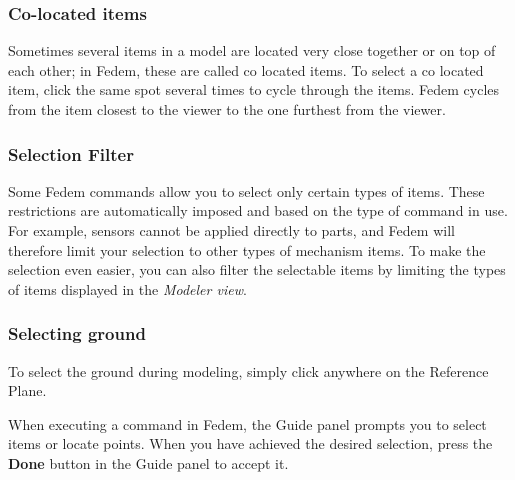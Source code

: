 
\subsubsection{Co-located items}

Sometimes several items in a model are located very close together or
on top of each other; in Fedem, these are called co located items.
To select a co located item, click the same spot several times to
cycle through the items. Fedem cycles from the item closest to the viewer to
the one furthest from the viewer.

\subsubsection{Selection Filter}

Some Fedem commands allow you to select only certain types of items.
These restrictions are automatically imposed and based on the type
of command in use. For example, sensors cannot be applied directly to
parts, and Fedem will therefore limit your selection to other types
of mechanism items. To make the selection even easier, you can also
filter the selectable items by limiting the types of items displayed
in the {\sl Modeler view}.


\subsubsection{Selecting ground}

To select the ground during modeling,
simply click anywhere on the Reference Plane.



When executing a command in Fedem, the Guide panel prompts you to select
items or locate points. When you have achieved the desired selection, press
the \textbf{Done} button in the Guide panel to accept it.



